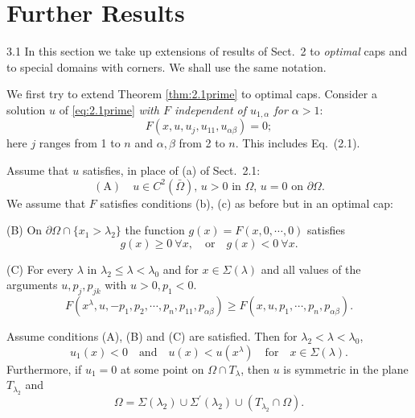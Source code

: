 \section{Further Results}
	
3.1 In this section we take up extensions of results of Sect.~2 to \textit{optimal} caps 
and to special domains with corners. We shall use the same notation.

We first try to extend Theorem \ref{thm:2.1prime} to optimal caps. 
Consider a solution $u$ of \eqref{eq:2.1prime}
\textit{with $F$ independent of $u_{1,\alpha}$ for $\alpha>1$}:
\begin{equation}\label{eq:3.1}
  F(x,u,u_j,u_{11},u_{\alpha\beta})=0;
\end{equation}
here $j$ ranges from 1 to $n$ and $\alpha,\beta$ from 2 to $n$. This includes Eq.~(2.1).

Assume that $u$ satisfies, in place of (a) of Sect.~2.1:
\[\mathrm{(A)}\quad \text{$u\in C^2(\bar{\Omega})$, $u>0$ in $\Omega$, $u=0$ on $\partial\Omega$.}\]
We assume that $F$ satisfies conditions (b), (c) as before but in an optimal cap: 

(B)  On $\partial\Omega\cap\{x_1>\lambda_2\}$ the function $g(x)=F(x,0,\cdots,0)$ satisfies
\[g(x)\geq 0\ \forall x,\quad\text{or}\quad g(x)<0\ \forall x.\]

(C)  For every $\lambda$ in $\lambda_2\leq \lambda<\lambda_0$ and for $x\in\Sigma(\lambda)$ and all values of the arguments $u,p_j,p_{jk}$ with $u>0,p_1<0$.
\begin{equation}\label{eq:3.2}
  F(x^{\lambda},u,-p_1,p_2,\cdots,p_n,p_{11},p_{\alpha\beta})\geq  F(x,u,p_1,\cdots,p_n,p_{\alpha\beta}).
\end{equation}

\begin{theorem}\label{thm:3.1}
  Assume conditions \textrm{(A)}, \textrm{(B)} and \textrm{(C)} are satisfied.
  Then for $\lambda_2<\lambda<\lambda_0$,
  \begin{equation}\label{eq:3.3}
    u_1(x)<0\quad\text{and}\quad u(x)<u(x^{\lambda})\quad\text{for}\quad x\in\Sigma(\lambda).
  \end{equation}
  Furthermore, if $u_1 =0$ at some point on $\Omega\cap T_{\lambda}$, then $u$ is symmetric in the plane $T_{\lambda_2}$ and
  \begin{equation}\label{eq:3.4}
    \Omega=\Sigma(\lambda_2)\cup\Sigma^{\prime}(\lambda_2)\cup(T_{\lambda_2}\cap\Omega).
  \end{equation}
\end{theorem}

